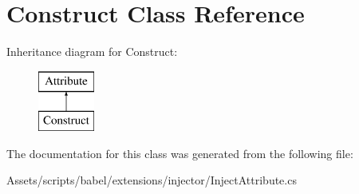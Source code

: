 \hypertarget{class_construct}{\section{Construct Class Reference}
\label{class_construct}
}
Inheritance diagram for Construct\-:\begin{figure}[H]
\begin{center}
\leavevmode
\includegraphics[height=2.000000cm]{class_construct}
\end{center}
\end{figure}


The documentation for this class was generated from the following file\-:\begin{DoxyCompactItemize}
\item 
Assets/scripts/babel/extensions/injector/Inject\-Attribute.\-cs\end{DoxyCompactItemize}
